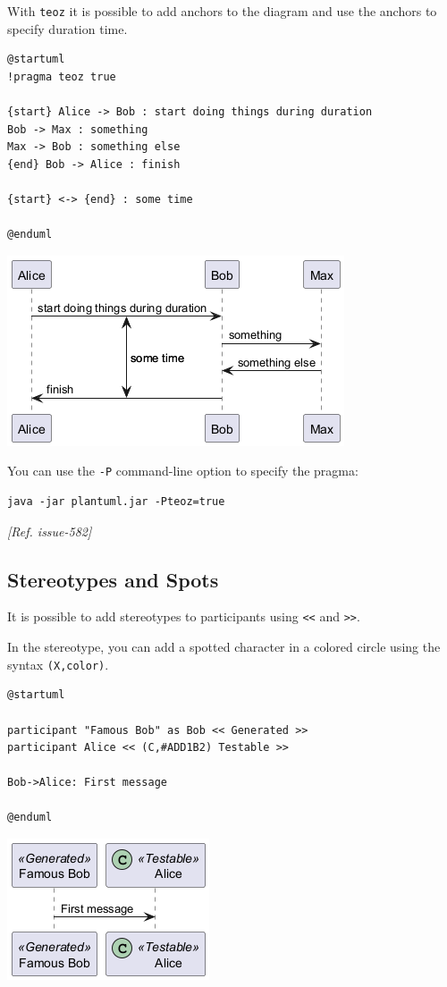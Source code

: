 With \texttt{teoz} it is possible to add anchors to the diagram and use the anchors to specify duration time.
\begin{verbatim}
@startuml
!pragma teoz true

{start} Alice -> Bob : start doing things during duration
Bob -> Max : something
Max -> Bob : something else
{end} Bob -> Alice : finish

{start} <-> {end} : some time

@enduml
\end{verbatim}
\begin{center}
\includegraphics[scale=0.60]{imgw/img-7fc708ff224c1ee3cb9607fb647c3e11.png}
\end{center}


You can use the \texttt{-P} command-line option to specify the pragma:
\begin{verbatim}
java -jar plantuml.jar -Pteoz=true
\end{verbatim}
\textit{[Ref. issue-582]}
%
%
\subsection{Stereotypes and Spots}






It is possible to add stereotypes to participants using \texttt{<<}
and \texttt{>>}.


In the stereotype, you can add a spotted character
in a colored circle using the syntax \texttt{(X,color)}.
\begin{verbatim}
@startuml

participant "Famous Bob" as Bob << Generated >>
participant Alice << (C,#ADD1B2) Testable >>

Bob->Alice: First message

@enduml
\end{verbatim}
\begin{center}
\includegraphics[scale=0.60]{imgw/img-9c89f6d111ffba9a5b4e94902a65a286.png}
\end{center}


